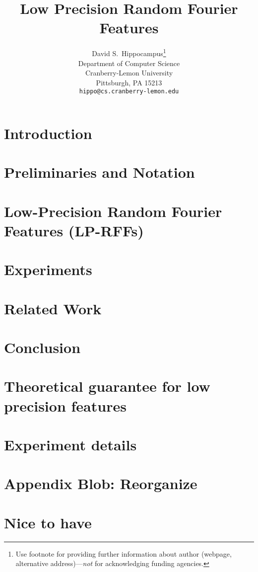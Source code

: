 \documentclass{article}
\title{Low Precision Random Fourier Features}
\author{
  David S.~Hippocampus\thanks{Use footnote for providing further
    information about author (webpage, alternative
    address)---\emph{not} for acknowledging funding agencies.} \\
  Department of Computer Science\\
  Cranberry-Lemon University\\
  Pittsburgh, PA 15213 \\
  \texttt{hippo@cs.cranberry-lemon.edu} \\
}
\begin{document}

\maketitle

\begin{abstract}

\end{abstract}

\section{Introduction}
\label{sec:intro}



\section{Preliminaries and Notation}
\label{sec:prelim}



\section{Low-Precision Random Fourier Features (LP-RFFs)}
\label{sec:lprff}


\section{Experiments}
\label{sec:experiments}


\section{Related Work}
\label{sec:relwork}


\section{Conclusion}
\label{sec:conclusion}




%

%

\clearpage

\appendix

\section{Theoretical guarantee for low precision features}
\label{sec:lprff_theory_appendix}


\section{Experiment details}
\label{sec:exp_details}


\section{Appendix Blob: Reorganize}




\section{Nice to have}
\label{sec:nicetohave}

\end{document}

